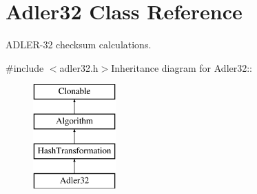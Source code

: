 \hypertarget{class_adler32}{
\section{Adler32 Class Reference}
\label{class_adler32}
}


ADLER-\/32 checksum calculations.  


{\ttfamily \#include $<$adler32.h$>$}Inheritance diagram for Adler32::\begin{figure}[H]
\begin{center}
\leavevmode
\includegraphics[height=4cm]{class_adler32}
\end{center}
\end{figure}
